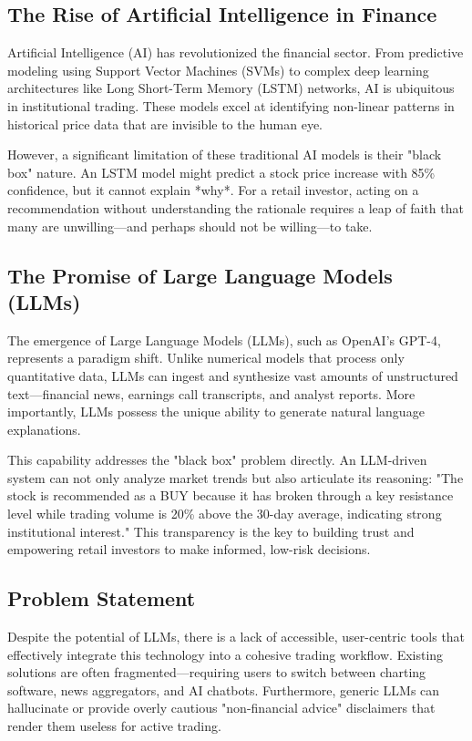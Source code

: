 \subsection{The Rise of Artificial Intelligence in Finance}
Artificial Intelligence (AI) has revolutionized the financial sector. From predictive modeling using Support Vector Machines (SVMs) to complex deep learning architectures like Long Short-Term Memory (LSTM) networks, AI is ubiquitous in institutional trading. These models excel at identifying non-linear patterns in historical price data that are invisible to the human eye.

However, a significant limitation of these traditional AI models is their "black box" nature. An LSTM model might predict a stock price increase with 85\% confidence, but it cannot explain *why*. For a retail investor, acting on a recommendation without understanding the rationale requires a leap of faith that many are unwilling—and perhaps should not be willing—to take.

\subsection{The Promise of Large Language Models (LLMs)}
The emergence of Large Language Models (LLMs), such as OpenAI's GPT-4, represents a paradigm shift. Unlike numerical models that process only quantitative data, LLMs can ingest and synthesize vast amounts of unstructured text—financial news, earnings call transcripts, and analyst reports. More importantly, LLMs possess the unique ability to generate natural language explanations.

This capability addresses the "black box" problem directly. An LLM-driven system can not only analyze market trends but also articulate its reasoning: "The stock is recommended as a BUY because it has broken through a key resistance level while trading volume is 20\% above the 30-day average, indicating strong institutional interest." This transparency is the key to building trust and empowering retail investors to make informed, low-risk decisions.

\subsection{Problem Statement}
Despite the potential of LLMs, there is a lack of accessible, user-centric tools that effectively integrate this technology into a cohesive trading workflow. Existing solutions are often fragmented—requiring users to switch between charting software, news aggregators, and AI chatbots. Furthermore, generic LLMs can hallucinate or provide overly cautious "non-financial advice" disclaimers that render them useless for active trading.

